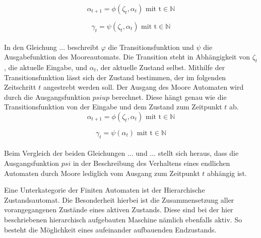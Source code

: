 	\begin{equation}
		\alpha_{t+1}=\phi(\zeta_t,\alpha_t)\text{    mit    t}\in\mathbb{N}
		\label{eq: transferfct}
	\end{equation}

	\begin{equation}
		\gamma_t=\psi(\zeta_t,\alpha_t)\text{    mit    t}\in\mathbb{N}
		\label{eq: transferfct}
	\end{equation}
	\\
	In den Gleichung ... beschreibt $\varphi$ die Transitionsfunktion und $\psi$ die Ausgabefunktion des Mooreautomats. Die Transition steht in Abhängigkeit von $\zeta_t $, die aktuelle Eingabe, und $\alpha_t$, der aktuelle Zustand selbst. Mithilfe der Transitionsfunktion lässt sich der Zustand bestimmen, der im folgenden Zeitschritt $t$ angestrebt werden soll. Der Ausgang des Moore Automaten wird durch die Ausgangsfunktion $psiup$ berechnet. Diese hängt genau wie die Transitionsfunktion von der Eingabe und dem Zustand zum Zeitpunkt $t$ ab. \\
	
	\begin{equation}
		\alpha_{t+1}=\phi(\zeta_t,\alpha_t)\text{    mit    t}\in\mathbb{N}
		\label{eq: transferfct}
	\end{equation}
	
	\begin{equation}
		\gamma_t=\psi(\alpha_t)\text{    mit    t}\in\mathbb{N}
		\label{eq: transferfct}
	\end{equation}
	\\
	
	Beim Vergleich der beiden Gleichungen ... und ... stellt sich heraus, dass die Ausgangsfunktion $psi$ in der Beschreibung des Verhaltens eines endlichen Automaten durch Moore lediglich vom Ausgang zum Zeitpunkt $t$ abhängig ist.
	
	Eine Unterkategorie der Finiten Automaten ist der Hierarchische Zustandsautomat. Die Besonderheit hierbei ist die Zusammensetzung aller vorangegangenen Zustände eines aktiven Zustands. Diese sind bei der hier beschriebenen hierarchisch aufgebauten Maschine nämlich ebenfalls aktiv. So besteht die Möglichkeit eines aufeinander aufbauenden Endzustands. 
	
	
		
		
